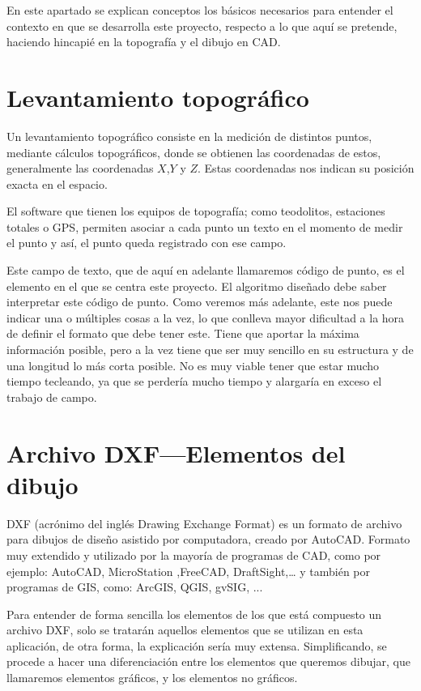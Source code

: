 
En este apartado se explican conceptos los básicos necesarios para entender el contexto en que se desarrolla este proyecto, respecto a lo que aquí se pretende, haciendo hincapié en la topografía y el dibujo en CAD. 

\section{Levantamiento topográfico}

Un levantamiento topográfico consiste en la medición de distintos puntos, mediante cálculos topográficos, donde se obtienen las coordenadas de estos, generalmente las coordenadas $X$,$Y$ y $Z$. Estas coordenadas nos indican su posición exacta en el espacio. 

El software que tienen los equipos de topografía; como teodolitos, estaciones totales o GPS, permiten asociar a cada punto un texto en el momento de medir el punto y así, el punto queda registrado con ese campo.

Este campo de texto, que de aquí en adelante llamaremos código de punto, es el elemento en el que se centra este proyecto. El algoritmo diseñado debe saber interpretar este código de punto. Como veremos más adelante, este nos puede indicar una o múltiples cosas a la vez, lo que conlleva mayor dificultad a la hora de definir el formato que debe tener este. Tiene que aportar la máxima información posible, pero a la vez tiene que ser muy sencillo en su estructura y de una longitud lo más corta posible. No es muy viable tener que estar mucho tiempo tecleando, ya que se perdería mucho tiempo y alargaría en exceso el trabajo de campo.

\section{Archivo DXF---Elementos del dibujo}

DXF (acrónimo del inglés Drawing Exchange Format) es un formato de archivo para dibujos de diseño asistido por computadora, creado por AutoCAD. Formato muy extendido y utilizado por la mayoría de programas de CAD, como por ejemplo: AutoCAD, MicroStation ,FreeCAD,  DraftSight,… y también por programas de GIS, como: ArcGIS, QGIS, gvSIG, ...

Para entender de forma sencilla los elementos de los que está compuesto un archivo DXF, solo se tratarán aquellos elementos que se utilizan en esta aplicación, de otra forma, la explicación sería muy extensa.
Simplificando, se procede a hacer una diferenciación entre los elementos que queremos dibujar, que llamaremos elementos gráficos, y los elementos no gráficos.

